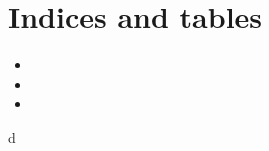 \documentclass[letterpaper,10pt,english]{sphinxmanual}
\begin{document}
\chapter{Indices and tables}
\label{\detokenize{index:indices-and-tables}}\begin{itemize}
\item {} 

\item {} 

\item {} 

\end{itemize}


\renewcommand{\indexname}{Python Module Index}
\begin{sphinxtheindex}
\def\bigletter#1{{\Large\sffamily#1}\nopagebreak\vspace{1mm}}
\bigletter{d}
\item {}
\end{sphinxtheindex}

\renewcommand{\indexname}{Index}
\printindex
\end{document}

